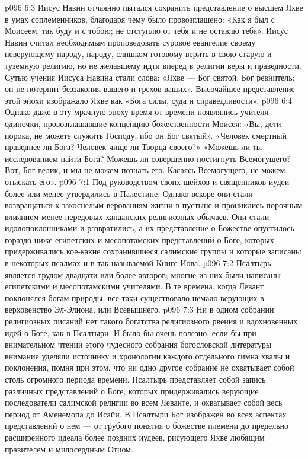 \vs p096 6:3 Иисус Навин отчаянно пытался сохранить представление о высшем Яхве в умах соплеменников, благодаря чему было провозглашено: «Как я был с Моисеем, так буду и с тобою; не отступлю от тебя и не оставлю тебя». Иисус Навин считал необходимым проповедовать суровое евангелие своему неверующему народу, народу, слишком готовому верить в свою старую и туземную религию, но не желавшему идти вперед в религии веры и праведности. Сутью учения Иисуса Навина стали слова: «Яхве --- Бог святой, Бог ревнитель; он не потерпит беззакония вашего и грехов ваших». Высочайшее представление этой эпохи изображало Яхве как «Бога силы, суда и справедливости».
\vs p096 6:4 Однако даже в эту мрачную эпоху время от времени появлялись учителя\hyp{}одиночки, провозглашавшие концепцию божественности Моисея: «Вы, дети порока, не можете служить Господу, ибо он Бог святый». «Человек смертный праведнее ли Бога? Человек чище ли Творца своего?» «Можешь ли ты исследованием найти Бога? Можешь ли совершенно постигнуть Всемогущего? Вот, Бог велик, и мы не можем познать его. Касаясь Всемогущего, не можем отыскать его».
\vs p096 7:1 Под руководством своих шейхов и священников иудеи более или менее утвердились в Палестине. Однако вскоре они стали возвращаться к закоснелым верованиям жизни в пустыне и прониклись порочным влиянием менее передовых ханаанских религиозных обычаев. Они стали идолопоклонниками и развратились, а их представление о Божестве опустилось гораздо ниже египетских и месопотамских представлений о Боге, которых придерживались кое\hyp{}какие сохранившиеся салимские группы и которые записаны в некоторых псалмах и в так называемой Книге Иова.
\vs p096 7:2 \pc Псалтырь является трудом двадцати или более авторов; многие из них были написаны египетскими и месопотамскими учителями. В те времена, когда Левант поклонялся богам природы, все\hyp{}таки существовало немало верующих в верховенство Эл\hyp{}Элиона, или Всевышнего.
\vs p096 7:3 Ни в одном собрании религиозных писаний нет такого богатства религиозного рвения и вдохновенных идей о Боге, как в Псалтыри. И было бы очень полезно, если бы при внимательном чтении этого чудесного собрания богословской литературы внимание уделяли источнику и хронологии каждого отдельного гимна хвалы и поклонения, помня при этом, что ни одно другое собрание не охватывает собой столь огромного периода времени. Псалтырь представляет собой запись различных представлений о Боге, которых придерживались верующие последователи салимской религии во всем Леванте, и охватывает собой весь период от Аменемопа до Исайи. В Псалтыри Бог изображен во всех аспектах представлений о нем --- от грубого понятия о божестве племени до предельно расширенного идеала более поздних иудеев, рисующего Яхве любящим правителем и милосердным Отцом.
